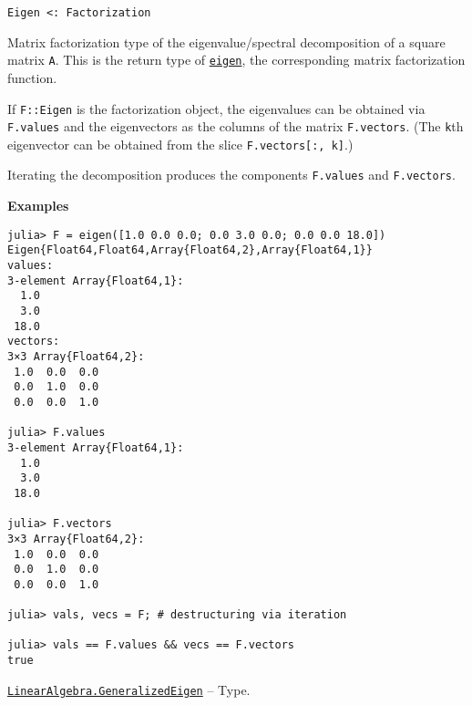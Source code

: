 \begin{adjustwidth}{2em}{0pt}


\begin{verbatim}
Eigen <: Factorization
\end{verbatim}

Matrix factorization type of the eigenvalue/spectral decomposition of a square matrix \texttt{A}. This is the return type of \hyperlink{11056016707394839114}{\texttt{eigen}}, the corresponding matrix factorization function.

If \texttt{F::Eigen} is the factorization object, the eigenvalues can be obtained via \texttt{F.values} and the eigenvectors as the columns of the matrix \texttt{F.vectors}. (The \texttt{k}th eigenvector can be obtained from the slice \texttt{F.vectors[:, k]}.)

Iterating the decomposition produces the components \texttt{F.values} and \texttt{F.vectors}.

\textbf{Examples}


\begin{verbatim}
julia> F = eigen([1.0 0.0 0.0; 0.0 3.0 0.0; 0.0 0.0 18.0])
Eigen{Float64,Float64,Array{Float64,2},Array{Float64,1}}
values:
3-element Array{Float64,1}:
  1.0
  3.0
 18.0
vectors:
3×3 Array{Float64,2}:
 1.0  0.0  0.0
 0.0  1.0  0.0
 0.0  0.0  1.0

julia> F.values
3-element Array{Float64,1}:
  1.0
  3.0
 18.0

julia> F.vectors
3×3 Array{Float64,2}:
 1.0  0.0  0.0
 0.0  1.0  0.0
 0.0  0.0  1.0

julia> vals, vecs = F; # destructuring via iteration

julia> vals == F.values && vecs == F.vectors
true
\end{verbatim}



\end{adjustwidth}
\hypertarget{6969744257762628976}{} 
\hyperlink{6969744257762628976}{\texttt{LinearAlgebra.GeneralizedEigen}}  -- {Type.}

